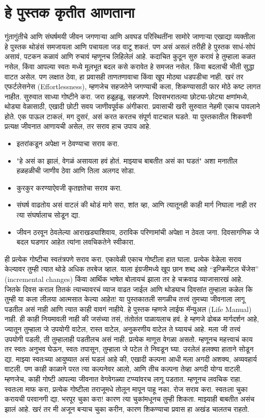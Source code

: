  \chapter{हे पुस्तक कृतीत आणताना}
गुंतागुंतीचे आणि संघर्षमयी जीवन जगणाऱ्या आणि अवघड परिस्थितींना सामोरे जाणाऱ्या एखाद्या व्यक्तीला हे पुस्तक थोडंसं समजायला आणि पचायला जड वाटू शकतं. पण असं असलं तरीही हे पुस्तक साधं-सोपं असावं, पटकन कळावं आणि रुचावं म्हणूनच लिहिलेलं आहे.
कदाचित कुठून सुरु करावं हे तुम्हाला कळत नसेल, किंवा आपल्या स्वतः मध्ये मूलभूत बदल कसे करावेत हे समजत नसेल. किंवा बदलाची भीती सुद्धा वाटत असेल. पण लक्षात ठेवा,  हा प्रवासही ताणतणावाचा किंवा खूप मोठ्या धडपडीचा नाही. खरं तर एफर्टलेसनेस (Effortlessness),  म्हणजेच सहजतेने जगण्याची कला,  शिकण्यासाठी फार मोठे कष्ट लागत नाहीत.
सुरुवात साध्या गोष्टीने करा. जरा हळूहळू, सहजपणे. दिवसभरातल्या छोट्या-छोट्या क्षणांमध्ये, थोड्या वेळासाठी, एखादी छोटी सवय जाणीवपूर्वक अंगीकारा.
प्रवासाची खरी सुरुवात नेहमी एकाच पावलाने होते. एक पाऊल टाकलं, मग दुसरं,  असं करत करतच संपूर्ण वाटचाल घडते.
या पुस्तकातील शिकवणी प्रत्यक्ष जीवनात आणायची असेल, तर सराव हाच उपाय आहे.
 \begin{itemize}
 \item इतरांकडून अपेक्षा न ठेवण्याचा सराव करा.
 \item "हे असं का झालं, वेगळं असायला हवं होतं. माझ्याच बाबतीत असं का घडतं" अशा मनातील हळहळीची जाणीव ठेवा आणि तिला अलगद सोडा.
 \item कुरकुर करण्याऐवजी कृतज्ञतेचा सराव करा.
 \item संघर्ष वाढतोय असं वाटलं की थोडं मागे सरा, शांत व्हा, आणि त्यातूनही काही मार्ग निघाला नाही तर त्या संघर्षालाच सोडून द्या.
 \item जीवन ठरवून ठेवलेल्या आराखड्याशिवाय, ठराविक परिणामांची अपेक्षा न ठेवता जगा. दिवसागणिक जे बदल घडणार आहेत त्यांना लवचिकतेने स्वीकारा.
 \end{itemize}
ही प्रत्येक गोष्टीचा स्वतंत्रपणे सराव करा. एकावेळी एकाच गोष्टीला हात घाला. प्रत्येक वेळेला सराव केल्यावर तुम्ही त्यात थोडे अधिक तरबेज व्हाल. याला इंग्रजीमध्ये खूप छान शब्द आहे “इन्क्रिमेंटल चेंजेस” (incremental changes) किंवा आर्थिक भाषेत बोलायचं झाला तर हे चक्रवाढ व्याजासारखं आहे. जितके दिवस कराल तितकं त्याच्यावरचं व्याज वाढत जाईल आणि थोड्याच दिवसांत तुम्हाला कळेल कि तुम्ही या कला लीलया आत्मसात केल्या आहेत!
या पुस्तकातली सगळीच तत्त्वं तुमच्या जीवनाला लागू पडतील असं नाही आणि त्यात काही वावगं नाहीये. हे पुस्तक म्हणजे लाईफ मॅन्युअल (Life Manual) नाही. ही काही नियमावली नाही की जसंच्या तसं, तंतोतंत पाळायलाच हवं. हे म्हणजे ढोबळ मार्गदर्शन आहे, ज्यातून तुम्हाला जे उपयोगी वाटेल, रास्त वाटेल, अनुकरणीय वाटेल ते घ्यायचं आहे. मला जी तत्त्वं उपयोगी पडली, ती तुम्हालाही पडतीलच असं नाही. प्रत्येक माणूस वेगळा असतो. म्हणूनच महत्त्वाचं काय तर स्वतः अनुभव घेऊन, स्वतः तपासून, तुम्हाला जे पटेल ते निवडून घ्या. उरलेलं हलक्या हाताने सोडून द्या.
माझ्या स्वतःच्या आयुष्यात असं घडलं आहे की, एखादी कल्पना आधी मला अगदी अशक्य, अव्यवहार्य वाटली. पण काही काळाने परत त्या कल्पनेवर आलो, आणि तीच कल्पना तेव्हा अगदी योग्य वाटली. म्हणजेच, काही गोष्टी आपल्या जीवनात वेगवेगळ्या टप्प्यांवरच लागू पडतात.
म्हणूनच लवचिक राहा. स्वतःला माफ करा, प्रत्येक गोष्टीला तराजूमधे तोलून मापून पाहू नका. रोज सराव करा. स्वतःला चुका करायची परवानगी द्या. भरपूर चुका करा! कारण त्या चुकांमधूनच तुम्ही शिकता. माझ्याही बाबतीत असंच झालं आहे. खरं तर मी अजून बऱ्याच चुका करीन, कारण शिकण्याचा प्रवास हा अखंड चालतच राहतो.
